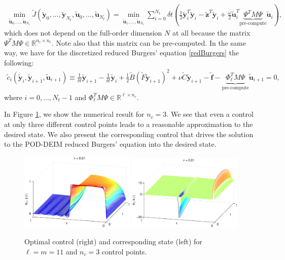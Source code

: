 \begin{align}
\label{redOpt_smallu}
\min_{\mathbf{\tilde{u}}_0,...,\mathbf{\tilde{u}}_{N_t}} \tilde{J}(\mathbf{\tilde y}_0,...,\mathbf{\tilde y}_{N_t},\mathbf{\tilde{u}}_0,...,\mathbf{\tilde{u}}_{N_t}) = \min_{\mathbf{\tilde{u}}_1,...,\mathbf{\tilde{u}}_{N_t}} \sum_{i=0}^{N_t} \delta \! t \left( \frac{1}{2} \mathbf{\tilde y}_i^T \mathbf{\tilde y}_i - \mathbf{\tilde z}^T\mathbf{\tilde y}_i + \frac{\omega}{2}\mathbf{\tilde{u}}_i^T \underbrace{\Psi^T M \Psi}_{\text{pre-compute}} \mathbf{\tilde{u}}_i \right),
\end{align}
which does not depend on the full-order dimension $N$ at all because the matrix $\Psi^T M \Psi \in \mathbb{R}^{n_c \times n_c}$. Note also that this matrix can be pre-computed. In the same way, we have for the discretized reduced Burgers' equation \eqref{redBurgers} the following:
\begin{align}
\label{redBurgers_smallu}
\tilde{c}_i(\mathbf{\tilde y}_i,\mathbf{\tilde y}_{i+1},\mathbf{\tilde u}_{i+1}) \equiv \frac{1}{\delta \! t} \mathbf{\tilde y}_{i+1} - \frac{1}{\delta \! t}\mathbf{\tilde y}_i + \frac{1}{2} \tilde{B}(\tilde{F}\mathbf{\tilde y}_{i+1})^2 + \nu \tilde{C}\mathbf{\tilde y}_{i+1} - \mathbf{\tilde f} - \underbrace{\Phi_\ell^T M \Psi}_{\text{pre-compute}} \mathbf{\tilde u}_{i+1} = 0,
\end{align}
where $i=0,...,N_t-1$ and $\Phi_\ell^T M \Psi \in \mathbb{R}^{\ell \times n_c}$.

In Figure \ref{result_Smallu}, we show the numerical result for $n_c = 3$. We see that even a control at only three different control points leads to a reasonable approximation to the desired state. We also present the corresponding control that drives the solution to the POD-DEIM reduced Burgers' equation into the desired state.
\begin{figure}[H]
\centering
\includegraphics[width=0.49\textwidth]{plots/y_smallu} \hfill
\includegraphics[width=0.49\textwidth]{plots/u_smallu}
\caption{Optimal control (right) and corresponding state (left) for $\ell = m = 11$ and $n_c = 3$ control points.}\label{result_Smallu}
\end{figure}
